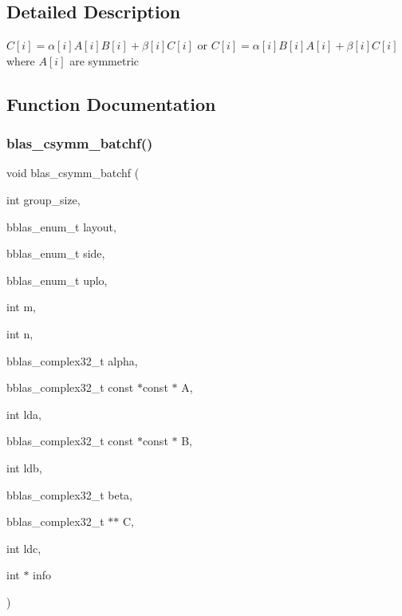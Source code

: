 \subsection{Detailed Description}
$ C[i] = \alpha[i] A[i] B[i] + \beta[i] C[i] $ or $ C[i] = \alpha[i] B[i] A[i] + \beta[i] C[i] $ where $ A[i] $ are symmetric 



\subsection{Function Documentation}
\mbox{\label{group__symm__batchf_ga3b7888d0a43cf26d146581c2615897e5}} 
\subsubsection{\texorpdfstring{blas\+\_\+csymm\+\_\+batchf()}{blas\_csymm\_batchf()}}
{\footnotesize\ttfamily void blas\+\_\+csymm\+\_\+batchf (\begin{DoxyParamCaption}\item[{int}]{group\+\_\+size,  }\item[{bblas\+\_\+enum\+\_\+t}]{layout,  }\item[{bblas\+\_\+enum\+\_\+t}]{side,  }\item[{bblas\+\_\+enum\+\_\+t}]{uplo,  }\item[{int}]{m,  }\item[{int}]{n,  }\item[{bblas\+\_\+complex32\+\_\+t}]{alpha,  }\item[{bblas\+\_\+complex32\+\_\+t const $\ast$const $\ast$}]{A,  }\item[{int}]{lda,  }\item[{bblas\+\_\+complex32\+\_\+t const $\ast$const $\ast$}]{B,  }\item[{int}]{ldb,  }\item[{bblas\+\_\+complex32\+\_\+t}]{beta,  }\item[{bblas\+\_\+complex32\+\_\+t $\ast$$\ast$}]{C,  }\item[{int}]{ldc,  }\item[{int $\ast$}]{info }\end{DoxyParamCaption})}

